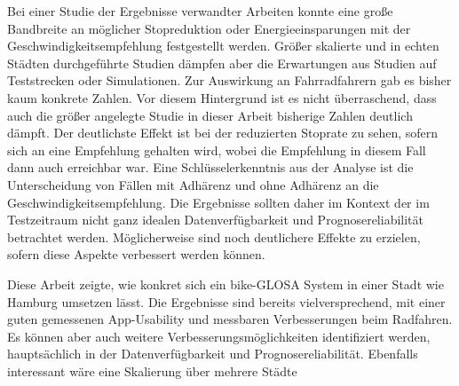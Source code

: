 Bei einer Studie der Ergebnisse verwandter Arbeiten konnte eine große Bandbreite an möglicher Stopreduktion oder Energieeinsparungen mit der Geschwindigkeitsempfehlung festgestellt werden. Größer skalierte und in echten Städten durchgeführte Studien dämpfen aber die Erwartungen aus Studien auf Teststrecken oder Simulationen. Zur Auswirkung an Fahrradfahrern gab es bisher kaum konkrete Zahlen. Vor diesem Hintergrund ist es nicht überraschend, dass auch die größer angelegte Studie in dieser Arbeit bisherige Zahlen deutlich dämpft. Der deutlichste Effekt ist bei der reduzierten Stoprate zu sehen, sofern sich an eine Empfehlung gehalten wird, wobei die Empfehlung in diesem Fall dann auch erreichbar war. Eine Schlüsselerkenntnis aus der Analyse ist die Unterscheidung von Fällen mit Adhärenz und ohne Adhärenz an die Geschwindigkeitsempfehlung. Die Ergebnisse sollten daher im Kontext der im Testzeitraum nicht ganz idealen Datenverfügbarkeit und Prognosereliabilität betrachtet werden. Möglicherweise sind noch deutlichere Effekte zu erzielen, sofern diese Aspekte verbessert werden können. 

Diese Arbeit zeigte, wie konkret sich ein bike-GLOSA System in einer Stadt wie Hamburg umsetzen lässt. Die Ergebnisse sind bereits vielversprechend, mit einer guten gemessenen App-Usability und messbaren Verbesserungen beim Radfahren. Es können aber auch weitere Verbesserungsmöglichkeiten identifiziert werden, hauptsächlich in der Datenverfügbarkeit und Prognosereliabilität. Ebenfalls interessant wäre eine Skalierung über mehrere Städte
